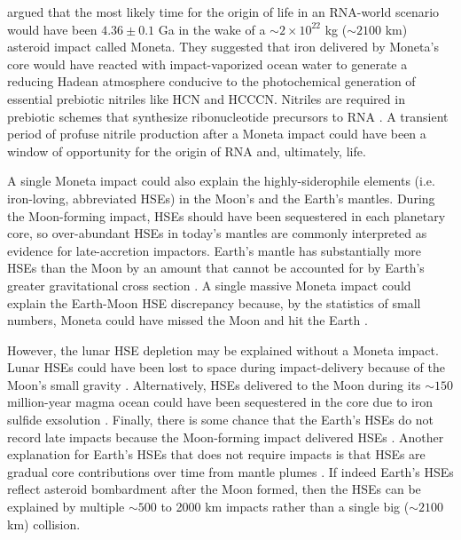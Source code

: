 \documentclass[manuscript]{aastex63}
\begin{document}
\citet{Benner_2020} argued that the most likely time for the origin of life in an RNA-world scenario would have been $4.36 \pm 0.1$ Ga in the wake of a $\sim 2 \times 10^{22}$ kg ($\sim 2100$ km) asteroid impact called Moneta. They suggested that iron delivered by Moneta's core would have reacted with impact-vaporized ocean water to generate a reducing Hadean atmosphere conducive to the photochemical generation of essential prebiotic nitriles like HCN and HCCCN. Nitriles are required in prebiotic schemes that synthesize ribonucleotide precursors to RNA \citep{Patel_2015,Powner_2009,Becker_2019}. A transient period of profuse nitrile production after a Moneta impact could have been a window of opportunity for the origin of RNA and, ultimately, life.

A single Moneta impact could also explain the highly-siderophile elements (i.e. iron-loving, abbreviated HSEs) in the Moon's and the Earth's mantles. During the Moon-forming impact, HSEs should have been sequestered in each planetary core, so over-abundant HSEs in today's mantles are commonly interpreted as evidence for late-accretion impactors. Earth's mantle has substantially more HSEs than the Moon by an amount that cannot be accounted for by Earth's greater gravitational cross section \citep{Day_2015}. A single massive Moneta impact could explain the Earth-Moon HSE discrepancy because, by the statistics of small numbers, Moneta could have missed the Moon and hit the Earth \citep{Sleep_1989,Bottke_2010}.

However, the lunar HSE depletion may be explained without a Moneta impact. Lunar HSEs could have been lost to space during impact-delivery because of the Moon's small gravity \citep{Kraus_2015}. Alternatively, HSEs delivered to the Moon during its $\sim 150$ million-year magma ocean could have been sequestered in the core due to iron sulfide exsolution \citep{Morbidelli_2018,Rubie_2016}. Finally, there is some chance that the Earth's HSEs do not record late impacts because the Moon-forming impact delivered HSEs \citep{Sleep_2016}. Another explanation for Earth's HSEs that does not require impacts is that HSEs are gradual core contributions over time from mantle plumes \citep{Halliday_2023,Mundl_2020}. If indeed Earth's HSEs reflect asteroid bombardment after the Moon formed, then the HSEs can be explained by multiple $\sim 500$ to 2000 km impacts rather than a single big ($\sim 2100$ km) collision.
\end{document}
